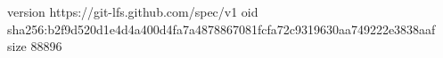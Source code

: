 version https://git-lfs.github.com/spec/v1
oid sha256:b2f9d520d1e4d4a400d4fa7a4878867081fcfa72c9319630aa749222e3838aaf
size 88896
